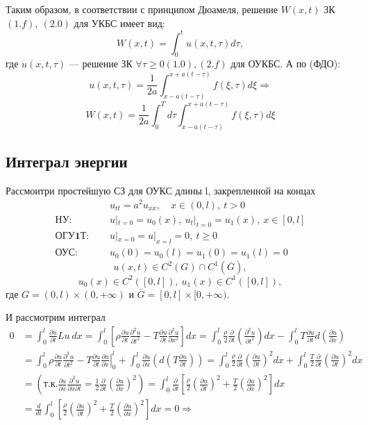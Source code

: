 Таким образом, в соответствии с принципом Дюамеля, решение $W(x, t)$ ЗК $(1.f),\ (2.0)$ для УКБС имеет вид: 
\[
W(x, t) = \int_0^tu(x, t, \tau) d\tau,
\]где $u(x, t,\tau)$ --- решение ЗК $\forall \tau \ge 0 (1.0), (2.f)$ для ОУКБС. А по (ФДО):
\[
u(x, t, \tau) = \frac{1}{2a} \int_{x-a(t-\tau)}^{x+a(t-\tau)} f(\xi, \tau) d\xi \Rightarrow
\]
\[
W(x, t) = \frac{1}{2a}\int_0^T d\tau \int_{x-a(t-\tau)}^{x+a(t-\tau)} f(\xi, \tau) d\xi
\]

\subsection{Интеграл энергии}

Рассмоитри простейшую СЗ для ОУКС длины l, закрепленной на концах
\begin{align*}
& u_{tt} = a^2 u_{xx}, \quad x \in (0,l),\ t > 0 \tag{1.0} \\
\textbf{НУ: } \quad & u|_{t=0} = u_0(x),\ u_t|_{t=0} = u_1(x),\ x \in [0,l] \tag{2} \\
\textbf{ОГУ1Т: } \quad & u|_{x=0} = u|_{x=l} = 0,\ t \ge 0 \tag{3.1.0} \\
\textbf{ОУС: } \quad & u_0(0) = u_0(l) = u_1(0) = u_1(l) = 0
\end{align*}
\[
u(x, t) \in C^2(G) \cap C^1(\overline{G}),
\]
\[
u_0(x) \in C^2([0, l]),\ u_1(x) \in C^1([0, l]),
\]
где $G=(0, l) \times (0, +\infty)$ и $\overline{G}=[0, l] \times [0, +\infty)$.

И рассмотрим интеграл
\begin{align*}
0 &= \int_0^l \frac{\partial u}{\partial t} Lu\ dx = \int_0^l\left[\rho \frac{\partial u}{\partial t} \frac{\partial^2 u}{\partial t^2} -T \frac{\partial u}{\partial t} \frac{\partial^2 u}{\partial x^2} \right]dx = \int_0^l \frac{\rho}{2} \frac{\partial}{\partial t}\left(\frac{\partial^2 u}{\partial t^2} \right)dx - \int_0^l T \frac{\partial u}{\partial t} d\left(\frac{\partial u}{\partial x} \right) \\
&= \int_0^l \rho \frac{\partial u}{\partial t} \frac{\partial^2 u}{\partial t^2} - T \frac{\partial u}{\partial t} \left. \frac{\partial u}{\partial x}\right|_0^l + \int_0^l \frac{\partial u}{\partial x} \left(d \left(T \frac{\partial u}{\partial t} \right) \right) = \int_0^l \frac{\rho}{2} \frac{\partial}{\partial t} \left( \frac{\partial u}{\partial t} \right)^2 dx + \int_0^l \frac{T}{2} \frac{\partial}{\partial t} \left( \frac{\partial u}{\partial t} \right)^2 dx \\
&= \left(\text{т.к.} \frac{\partial u}{\partial x} \frac{\partial^2 u}{\partial x \partial t} =
\frac{1}{2} \frac{\partial }{\partial t} \left( \frac{\partial u}{\partial x} \right)^2
\right) = \int_0^l \frac{\partial}{\partial t} \left[ \frac{\rho}{2} \left( \frac{\partial u}{\partial t} \right)^2 + \frac{T}{2}\left( \frac{\partial u}{\partial x} \right)^2 \right] dx \\
&= \frac{d}{dt} \int_0^l \left[ \frac{\rho}{2} \left( \frac{\partial u}{\partial t} \right)^2 + \frac{T}{2}\left( \frac{\partial u}{\partial x} \right)^2 \right]dx = 0 \Rightarrow
\end{align*}

